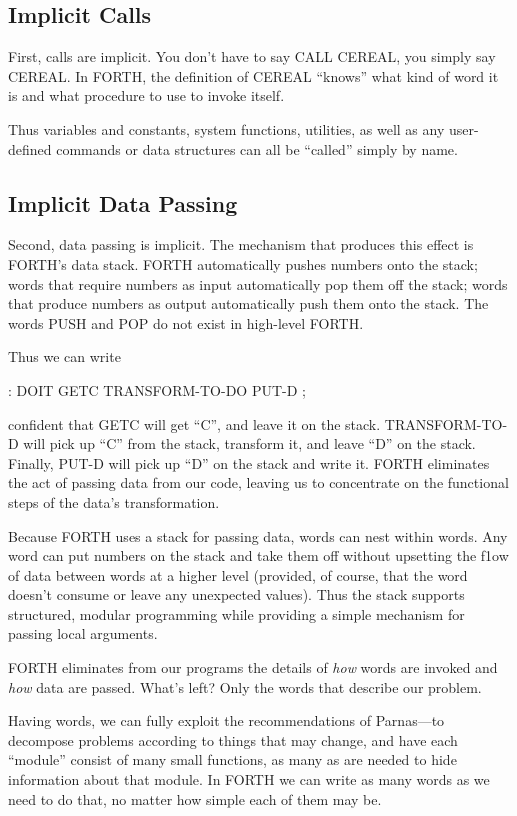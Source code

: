 \subsection{Implicit Calls}
First, calls are implicit. You don't have to say CALL CEREAL, you
simply say CEREAL. In FORTH, the definition of CEREAL {}``knows''
what kind of word it is and what procedure to use to invoke itself.

Thus variables and constants, system functions, utilities, as well
as any user-defined commands or data structures can all be {}``called''
simply by name.


\othersidetrue\subsection{Implicit Data Passing}
\othersidefalse
Second, data passing is implicit. The mechanism that produces this
effect is FORTH's data stack. FORTH automatically pushes numbers onto
the stack; words that require numbers as input automatically pop them
off the stack; words that produce numbers as output automatically
push them onto the stack. The words PUSH and POP do not exist in high-level
FORTH.

Thus we can write

\begin{Code}
: DOIT
    GETC  TRANSFORM-TO-DO  PUT-D ;
\end{Code}
confident that GETC will get {}``C'', and leave it on the stack.
TRANSFORM-TO-D will pick up {}``C'' from the stack, transform it,
and leave {}``D'' on the stack. Finally, PUT-D will pick up {}``D''
on the stack and write it. FORTH eliminates the act of passing data
from our code, leaving us to concentrate on the functional steps of
the data's transformation.

Because FORTH uses a stack for passing data, words can nest within
words. Any word can put numbers on the stack and take them off without
upsetting the f1ow of data between words at a higher level (provided,
of course, that the word doesn't consume or leave any unexpected values).
Thus the stack supports structured, modular programming while providing
a simple mechanism for passing local arguments.

FORTH eliminates from our programs the details of \emph{how} words
are invoked and \emph{how} data are passed. What's left? Only the
words that describe our problem.

Having words, we can fully exploit the recommendations of Parnas---to
decompose problems according to things that may change, and have each
{}``module'' consist of many small functions, as many as are needed
to hide information about that module. In FORTH we can write as many
words as we need to do that, no matter how simple each of them may
be.

